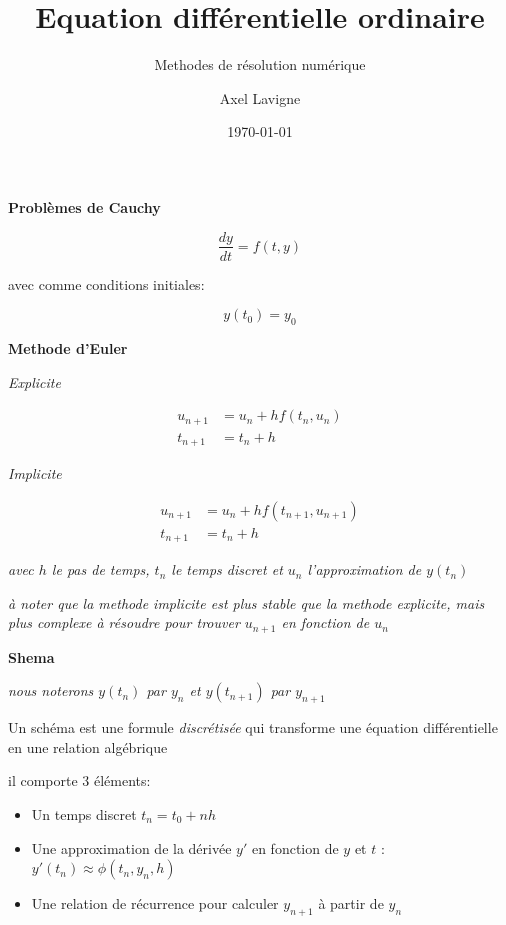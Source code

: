 \documentclass{article}
\title{Equation différentielle ordinaire}
\subtitle{Methodes de résolution numérique}
\author{Axel Lavigne}
\date{\today}
\newcommand{\smalltext}[1]{
    \scriptsize
    \textit{#1}
    \normalsize
}
\begin{document}
\maketitle

\textbf{Problèmes de Cauchy}

\begin{equation*}
    \frac{dy}{dt} = f(t, y)
\end{equation*}

avec comme conditions initiales:

\begin{equation*}
    y(t_0) = y_0
\end{equation*}


\textbf{Methode d'Euler}

\textit{Explicite}

\begin{align*}
    u_{n+1} &= u_n + h f(t_n, u_n) \\
    t_{n+1} &= t_n + h
\end{align*}

\textit{Implicite}

\begin{align*}
    u_{n+1} &= u_n + h f(t_{n+1}, u_{n+1}) \\
    t_{n+1} &= t_n + h
\end{align*}

\smalltext{avec $h$ le pas de temps, $t_n$ le temps discret et $u_n$ l'approximation de $y(t_n)$}

\smalltext{à noter que la methode implicite est plus stable que la methode explicite, 
mais plus complexe à résoudre pour trouver $u_{n+1}$ en fonction de $u_n$} 

\textbf{Shema}


\smalltext{nous noterons $y(t_n)$ par $y_n$ et $y(t_{n+1})$ par $y_{n+1}$}

Un schéma est une formule \textit{discrétisée} qui transforme une équation différentielle en une relation algébrique

il comporte 3 éléments:

\begin{itemize}
    \item Un temps discret $t_n = t_0 + n h$
    \item Une approximation de la dérivée $y'$ en fonction de $y$ et $t$ : $y'(t_n) \approx \phi(t_n, y_n, h)$
    \item Une relation de récurrence pour calculer $y_{n+1}$ à partir de $y_n$
\end{itemize}
\end{document}
